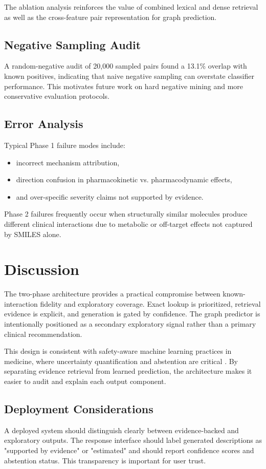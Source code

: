 \documentclass[conference]{IEEEtran}
\begin{document}
The ablation analysis reinforces the value of combined lexical and dense retrieval as well as the cross-feature pair representation for graph prediction.

\subsection{Negative Sampling Audit}
A random-negative audit of 20,000 sampled pairs found a 13.1\% overlap with known positives, indicating that naive negative sampling can overstate classifier performance. This motivates future work on hard negative mining and more conservative evaluation protocols.

\subsection{Error Analysis}
Typical Phase 1 failure modes include:
\begin{itemize}
    \item incorrect mechanism attribution,
    \item direction confusion in pharmacokinetic vs. pharmacodynamic effects,
    \item and over-specific severity claims not supported by evidence.
\end{itemize}
Phase 2 failures frequently occur when structurally similar molecules produce different clinical interactions due to metabolic or off-target effects not captured by SMILES alone.

\section{Discussion}
The two-phase architecture provides a practical compromise between known-interaction fidelity and exploratory coverage. Exact lookup is prioritized, retrieval evidence is explicit, and generation is gated by confidence. The graph predictor is intentionally positioned as a secondary exploratory signal rather than a primary clinical recommendation.

This design is consistent with safety-aware machine learning practices in medicine, where uncertainty quantification and abstention are critical \cite{geifman2017selective, guo2017calibration}. By separating evidence retrieval from learned prediction, the architecture makes it easier to audit and explain each output component.

\subsection{Deployment Considerations}
A deployed system should distinguish clearly between evidence-backed and exploratory outputs. The response interface should label generated descriptions as "supported by evidence" or "estimated" and should report confidence scores and abstention status. This transparency is important for user trust.
\end{document}
